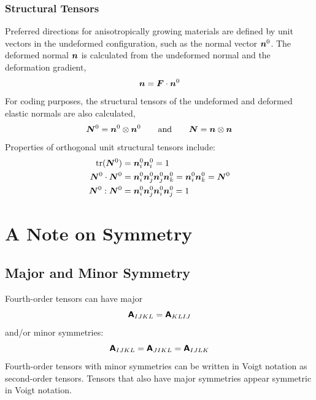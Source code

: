 \documentclass[10pt,letterpaper,oneside]{report}
\newcommand{\ten}[1]{\mbox{\boldmath $#1$}{}}
\newcommand{\tenf}[1]{\mbox{{\sffamily{\bfseries {#1}}}}}
\begin{document}
\begin{itemize}
\subsection{Structural Tensors}
Preferred directions for anisotropically growing materials are defined by unit vectors in the undeformed configuration, such as the normal vector $\ten{n}^0$.  The deformed normal $\ten{n}$ is calculated from the undeformed normal and the deformation gradient,
\begin{equation}
\ten{n} = \ten{F} \cdot \ten{n}^0
\end{equation}
For coding purposes, the structural tensors of the undeformed and deformed elastic normals are also calculated, 
\begin{equation}
\ten{N}^0 = \ten{n}^0 \otimes \ten{n}^0 
\qquad \mbox{and} \qquad 
\ten{N} = \ten{n} \otimes \ten{n}
\end{equation}
Properties of orthogonal unit structural tensors include:
\begin{align}
\mbox{tr} (\ten{N}^0) ={}& \ten{n}^0_i \ten{n}^0_i = 1 \\
\ten{N}^0 \cdot \ten{N}^0 ={}& \ten{n}^0_i \ten{n}^0_j \ten{n}^0_j \ten{n}^0_k = \ten{n}^0_i \ten{n}^0_k = \ten{N}^0 \\
\ten{N}^0 : \ten{N}^0 ={}& \ten{n}^0_i \ten{n}^0_j \ten{n}^0_i \ten{n}^0_j = 1
\end{align}


\chapter{A Note on Symmetry}

\section{Major and Minor Symmetry}
\label{sec:symmetry}
Fourth-order tensors can have major 
\begin{equation}
\tenf{A}_{IJKL} = \tenf{A}_{KLIJ} 
\end{equation}
and/or minor symmetries:
\begin{equation}
\tenf{A}_{IJKL} = \tenf{A}_{JIKL} = \tenf{A}_{IJLK} 
\end{equation}
Fourth-order tensors with minor symmetries can be written in Voigt notation as second-order tensors.  Tensors that also have major symmetries appear symmetric in Voigt notation.  


\end{itemize}
\end{document}
